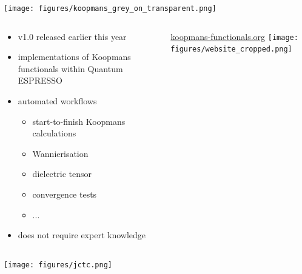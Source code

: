 \documentclass[xcolor=table,aspectratio=169]{beamer}
\numberwithin{equation}{section}
\begin{document}
\begin{frame}{}
   \begin{center}
      \texttt{[image: figures/koopmans\_grey\_on\_transparent.png]}
   \end{center}

   \vspace{-2ex}

   \begin{columns}
      \begin{column}{0.55\textwidth}
         \small
         \begin{itemize}
            \item v1.0 released earlier this year
            \item implementations of Koopmans functionals within Quantum ESPRESSO
            \item automated workflows
                  \begin{itemize}
                     \item start-to-finish Koopmans calculations
                     \item Wannierisation
                     \item dielectric tensor
                     \item convergence tests
                     \item ...
                  \end{itemize}
            \item does not require expert knowledge
         \end{itemize}
      \end{column}

      \begin{column}{0.4\textwidth}
         \centering
         \url{koopmans-functionals.org}
         \texttt{[image: figures/website\_cropped.png]}
      \end{column}
   \end{columns}
\end{frame}

\begingroup
{}
\begin{frame}{}
   \texttt{[image: figures/jctc.png]}
   
\end{frame}
\endgroup
\end{document}
